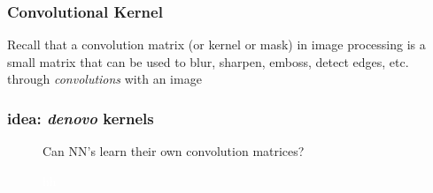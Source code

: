 \documentclass[xcolor={dvipsnames}]{beamer}
\begin{document}
\frame
{
 \frametitle{Convolutional Kernel}

Recall that a convolution matrix (or kernel or mask) in image processing is a small matrix 
that can be used to blur, sharpen, emboss, detect edges, etc. through \emph{convolutions}
with an image 


\begin{figure}
\centering
{}
\end{figure}

}



\frame
{
 \frametitle{idea: \emph{denovo} kernels}

\begin{figure}
\centering
\Huge
Can NN's learn their own convolution matrices? 

\vspace{.25in}
 \textcolor{white}{hh}

\end{figure}

}
\end{document}
